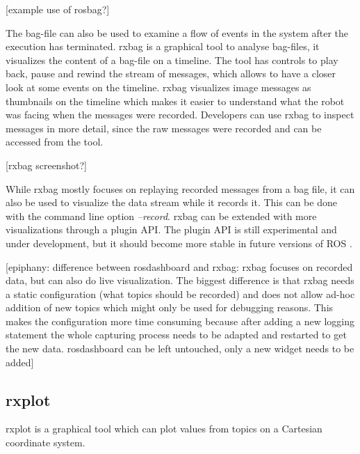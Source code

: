 [example use of rosbag?]

The bag-file can also be used to examine a flow of events in the system after the execution has terminated. rxbag is a graphical tool to analyse bag-files, it visualizes the content of a bag-file on a timeline. The tool has controls to play back, pause and rewind the stream of messages, which allows to have a closer look at some events on the timeline. rxbag visualizes image messages as thumbnails on the timeline which makes it easier to understand what the robot was facing when the messages were recorded. Developers can use rxbag to inspect messages in more detail, since the raw messages were recorded and can be accessed from the tool.

[rxbag screenshot?]

While rxbag mostly focuses on replaying recorded messages from a bag file, it can also be used to visualize the data stream while it records it. This can be done with the command line option \emph{--record}. rxbag can be extended with more visualizations through a plugin API. The plugin API is still experimental and under development, but it should become more stable in future versions of ROS \cite{rxbag}.

[epiphany: difference between rosdashboard and rxbag: rxbag focuses on recorded data, but can also do live visualization. The biggest difference is that rxbag needs a static configuration (what topics should be recorded) and does not allow ad-hoc addition of new topics which might only be used for debugging reasons. This makes the configuration more time consuming because after adding a new logging statement the whole capturing process needs to be adapted and restarted to get the new data. rosdashboard can be left untouched, only a new widget needs to be added]


\subsection{rxplot}
rxplot is a graphical tool which can plot values from topics on a Cartesian coordinate system. 

